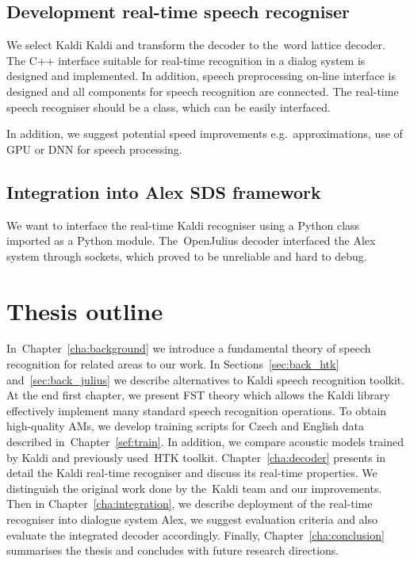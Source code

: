 \subsection{Development real-time speech recogniser} 
\label{sub:compare_rt}

We select Kaldi  Kaldi and transform the decoder to the~word lattice decoder. 
The C++ interface suitable for real-time recognition in a dialog system is designed and implemented.
In addition, speech preprocessing on-line interface is designed and all components for speech recognition
are connected.
The real-time speech recogniser should be a class, which can be easily interfaced.

In addition, we suggest potential speed improvements e.g.\ approximations, use of \ac{GPU} 
or \ac{DNN} for speech processing\cite{vesely2013sequencediscriminative}.

\subsection[Integration into Alex \acs{SDS} framework]{Integration into Alex \acl{SDS} framework} 
\label{sub:integration}
We want to interface the real-time Kaldi recogniser using a Python class imported as a Python module.
The~OpenJulius decoder interfaced the Alex system through sockets, which proved to be unreliable and hard to debug.


\section*{Thesis outline} 
In~Chapter~\ref{cha:background} we introduce a fundamental theory of speech recognition for related areas to our work.
In Sections~\ref{sec:back_htk} and~\ref{sec:back_julius} we describe alternatives to Kaldi speech recognition toolkit. 
At the end first chapter, we present \ac{FST} theory which allows the Kaldi library effectively implement many standard speech recognition operations. 
To obtain high-quality \aclp{AM}, we develop training scripts for Czech and English data described in~Chapter~\ref{sef:train}. 
In addition, we compare acoustic models trained by Kaldi and previously used~\ac{HTK} toolkit. 
Chapter~\ref{cha:decoder} presents in detail the Kaldi real-time recogniser and discuss its real-time properties.
We distinguish the original work done by the~Kaldi team and our improvements. 
Then in Chapter~\ref{cha:integration}, we describe deployment of the real-time recogniser into dialogue system Alex, we suggest evaluation criteria and also evaluate the integrated decoder accordingly.
Finally, Chapter~\ref{cha:conclusion} summarises the thesis and concludes with future research directions.

